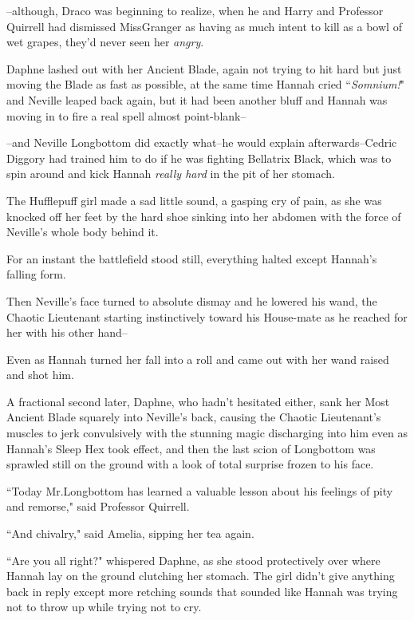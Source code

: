 \---although, Draco was beginning to realize, when he and Harry and Professor Quirrell had dismissed Miss\?Granger as having as much intent to kill as a bowl of wet grapes, they'd never seen her \emph{angry}.

\later

Daphne lashed out with her Ancient Blade, again not trying to hit hard but just moving the Blade as fast as possible, at the same time Hannah cried ``\emph{Somnium!}" and Neville leaped back again, but it had been another bluff and Hannah was moving in to fire a real spell almost point-blank\---

\---and Neville Longbottom did exactly what\---he would explain afterwards\---Cedric Diggory had trained him to do if he was fighting Bellatrix Black, which was to spin around and kick Hannah \emph{really hard} in the pit of her stomach.

The Hufflepuff girl made a sad little sound, a gasping cry of pain, as she was knocked off her feet by the hard shoe sinking into her abdomen with the force of Neville's whole body behind it.

For an instant the battlefield stood still, everything halted except Hannah's falling form.

Then Neville's face turned to absolute dismay and he lowered his wand, the Chaotic Lieutenant starting instinctively toward his House-mate as he reached for her with his other hand\---

Even as Hannah turned her fall into a roll and came out with her wand raised and shot him.

A fractional second later, Daphne, who hadn't hesitated either, sank her Most Ancient Blade squarely into Neville's back, causing the Chaotic Lieutenant's muscles to jerk convulsively with the stunning magic discharging into him even as Hannah's Sleep Hex took effect, and then the last scion of Longbottom was sprawled still on the ground with a look of total surprise frozen to his face.

\later

``Today Mr.\?Longbottom has learned a valuable lesson about his feelings of pity and remorse," said Professor Quirrell.

``And chivalry," said Amelia, sipping her tea again.

\later

``Are you all right?" whispered Daphne, as she stood protectively over where Hannah lay on the ground clutching her stomach. The girl didn't give anything back in reply except more retching sounds that sounded like Hannah was trying not to throw up while trying not to cry.

